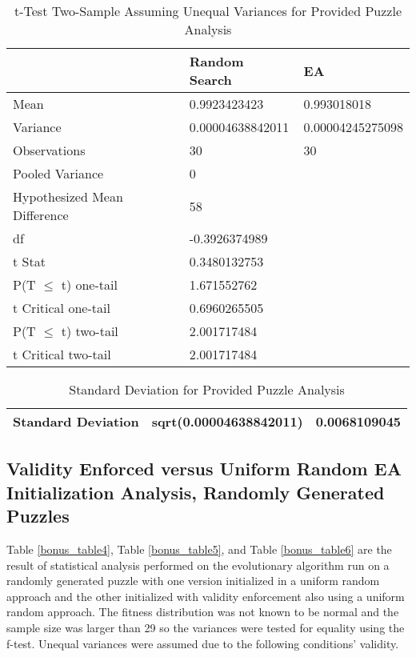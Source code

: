 \documentclass[11pt]{article}
\begin{document}
\begin{table}[H]
\centering
\caption{t-Test Two-Sample Assuming Unequal Variances for Provided Puzzle Analysis}
\label{bonus_table2}
\begin{tabular}{l|l|l}
 & Random Search & EA \\ \hline
Mean & 0.9923423423 & 0.993018018 \\
Variance & 0.00004638842011 & 0.00004245275098 \\
Observations & 30 & 30 \\
Pooled Variance & 0 &  \\
Hypothesized Mean Difference & 58 &  \\
df & -0.3926374989 &  \\
t Stat & 0.3480132753 &  \\
P(T $\leq$ t) one-tail & 1.671552762 &  \\
t Critical one-tail & 0.6960265505 &  \\
P(T $\leq$ t) two-tail & 2.001717484 &  \\
t Critical two-tail & 2.001717484 & 
\end{tabular}
\end{table}

\begin{table}[H]
\centering
\caption{Standard Deviation for Provided Puzzle Analysis}
\label{bonus_table3}
\begin{tabular}{|l|l|l|}
\hline
Standard Deviation & sqrt(0.00004638842011) & 0.0068109045 \\ \hline
\end{tabular}
\end{table}




\subsection{Validity Enforced versus Uniform Random EA Initialization Analysis, Randomly Generated Puzzles}

Table \ref{bonus_table4}, Table \ref{bonus_table5}, and Table \ref{bonus_table6} are the result of statistical analysis performed on 
the evolutionary algorithm run on a randomly generated puzzle with one version 
initialized in a uniform random approach and the other initialized with validity 
enforcement also using a uniform random approach. The fitness distribution was not 
known to be normal and the sample size was larger than 29 so the variances were 
tested for equality using the f-test. Unequal variances were assumed due to the 
following conditions' validity.
\end{document}
